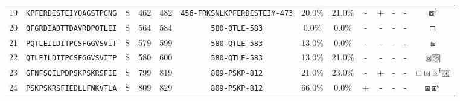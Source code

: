 \begin{tabular}{rcccccccccccc}
19 &  \texttt{KPFERDISTEIYQAGSTPCNG} &       S &    462 &   482 &  \texttt{{\scriptsize 456-}FRKSNLKPFERDISTEIY{\scriptsize -473}} &                          20.0\% &                           21.0\% &          - &           + &          - &           - &                                                                                                                   $ \boxcircle^b $ \\
20 &  \texttt{QFGRDIADTTDAVRDPQTLEI} &       S &    564 &   584 &                \texttt{{\scriptsize 580-}QTLE{\scriptsize -583}} &                           0.0\% &                            0.0\% &          - &           - &          - &           - &                                                                                                                      $ \boxempty $ \\
21 &  \texttt{PQTLEILDITPCSFGGVSVIT} &       S &    579 &   599 &                \texttt{{\scriptsize 580-}QTLE{\scriptsize -583}} &                          13.0\% &                            0.0\% &          - &           - &          - &           - &                                                                                                                        $ \boxast $ \\
22 &  \texttt{QTLEILDITPCSFGGVSVITP} &       S &    580 &   600 &                \texttt{{\scriptsize 580-}QTLE{\scriptsize -583}} &                          13.0\% &                           21.0\% &          - &           - &          - &           - &                                                                     $ \boxcircle \setlength{\fboxsep}{0.5pt} \boxed{\circledast} $ \\
23 &  \texttt{GFNFSQILPDPSKPSKRSFIE} &       S &    799 &   819 &                \texttt{{\scriptsize 809-}PSKP{\scriptsize -812}} &                          21.0\% &                           23.0\% &          - &           + &          - &           - &                                              $ \boxempty \boxcircle \boxcircle^b \setlength{\fboxsep}{0.5pt} \boxed{\circledast} $ \\
24 &  \texttt{PSKPSKRSFIEDLLFNKVTLA} &       S &    809 &   829 &                \texttt{{\scriptsize 809-}PSKP{\scriptsize -812}} &                          66.0\% &                            0.0\% &          + &           - &          - &           - &                                                                                                              $ \boxast \boxast^b $ \\
\bottomrule
\end{tabular}
